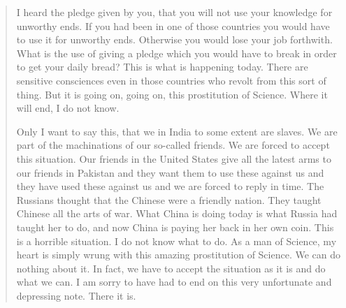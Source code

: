 \begin{quote}
{I heard the pledge given by you, that you will not use your knowledge for unworthy ends. If you had been in one of those countries you would have to use it for unworthy ends. Otherwise you would lose your job forthwith. What is the use of giving a pledge which you would have to break in order to get your daily bread? This is what is happening today. There are sensitive consciences even in those countries who revolt from this sort of thing. But it is going on, going on, this prostitution of Science. Where it will end, I do not know.

Only I want to say this, that we in India to some extent are slaves. We are part of the machinations of our so-called friends. We are forced to accept this situation. Our friends in the United States give all the latest arms to our friends in Pakistan and they want them to use these against us and they have used these against us and we are forced to reply in time. The Russians thought that the Chinese were a friendly nation. They taught Chinese all the arts of war. What China is doing today is what Russia had taught her to do, and now China is paying her back in her own coin. This is a horrible situation. I do not know what to do. As a man of Science, my heart is simply wrung with this amazing prostitution of Science. We can do nothing about it. In fact, we have to accept the situation as it is and do what we can. I am sorry to have had to end on this very unfortunate and depressing note. There it is.
}\relax
\end{quote}

